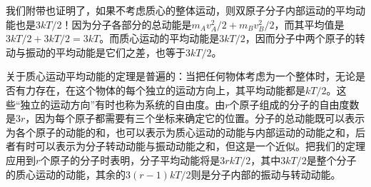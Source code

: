 我们附带也证明了，如果不考虑质心的整体运动，则双原子分子内部运动的平均动能也是$3kT/2$！因为分子各部分的总动能是$m_Av_A^2/2 + m_Bv_B^2/2$，而其平均值是$3kT/2+3kT/2=3kT$。而质心运动的平均动能是$3kT/2$，因而分子中两个原子的转动与振动的平均动能是它们之差，也等于$3kT/2$。

关于质心运动平均动能的定理是普遍的：当把任何物体考虑为一个整体时，无论是否有力存在，在这个物体的每个独立的运动方向上，其平均动能都是$kT/2$。这些“独立的运动方向”有时也称为系统的自由度。由$r$个原子组成的分子的自由度数是$3r$，因为每个原子都需要有三个坐标来确定它的位置。分子的总动能既可以表示为各个原子的动能的和，也可以表示为质心运动的动能与内部运动的动能之和，后者有时可以表示为分子转动动能与振动动能之和，但这是一个近似。把我们的定理应用到$r$个原子的分子时表明，分子平均动能将是$3rkT/2$，其中$3kT/2$是整个分子的质心运动的动能，其余的$3(r-1)kT/2$则是分子内部的振动与转动动能。

